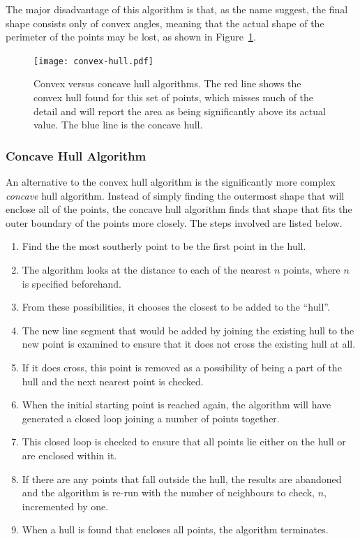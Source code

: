The major disadvantage of this algorithm is that, as the name suggest, the
final shape consists only of convex angles, meaning that the actual shape of
the perimeter of the points may be lost, as shown in
Figure~\ref{fig:convex-hull}.

\begin{figure}[tbhp]
	\centering
	\texttt{[image: convex-hull.pdf]}

	\caption[Convex versus concave hull algorithms.]{Convex versus concave hull
		algorithms. The red line shows the convex hull found for this set of
		points, which misses much of the detail and will report the area as
		being significantly above its actual value. The blue line is the
		concave hull.}\label{fig:convex-hull}
\end{figure}

\subsubsection*{Concave Hull Algorithm}
\label{ssub:Concave Hull Algorithm}

An alternative to the convex hull algorithm is the significantly more complex
\emph{concave} hull algorithm\cite{moreira2007concave}. Instead of simply
finding the outermost shape that will enclose all of the points, the concave
hull algorithm finds that shape that fits the outer boundary of the points more
closely. The steps involved are listed below.

\begin{enumerate}
	\item Find the the most southerly point to be the first point in the hull.
	\item The algorithm looks at the distance to each of the nearest $n$
		points, where $n$ is specified beforehand.
	\item From these possibilities, it chooses the closest to be added to the
		``hull''.
	\item The new line segment that would be added by joining the existing hull
		to the new point is examined to ensure that it does not cross the
		existing hull at all.
	\item If it does cross, this point is removed as a possibility of being a
		part of the hull and the next nearest point is checked.
	\item When the initial starting point is reached again, the algorithm will
		have generated a closed loop joining a number of points together.
	\item This closed loop is checked to ensure that all points lie either on
		the hull or are enclosed within it.
	\item If there are any points that fall outside the hull, the results are
		abandoned and the algorithm is re-run with the number of neighbours to
		check, $n$, incremented by one.
	\item When a hull is found that encloses all points, the algorithm
		terminates.
\end{enumerate}

